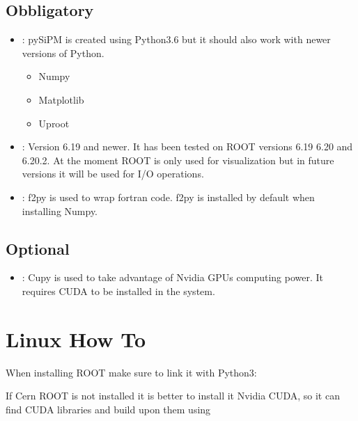 \documentclass[letterpaper,10pt,english]{sphinxmanual}
\begin{document}
\subsection{Obbligatory}
\label{\detokenize{installation:obbligatory}}\begin{itemize}
\item {} 
: pySiPM is created using Python3.6 but it should also work with newer versions of Python.
\begin{itemize}
\item {} 
Numpy

\item {} 
Matplotlib

\item {} 
Uproot

\end{itemize}

\item {} 
: Version 6.19 and newer. It has been tested on ROOT versions 6.19 \sphinxhyphen{} 6.20 and 6.20.2. At the moment ROOT is only used for visualization but in future versions it will be used for I/O operations. 

\item {} 
: f2py is used to wrap fortran code. f2py is installed by default when installing Numpy.

\end{itemize}


\subsection{Optional}
\label{\detokenize{installation:optional}}\begin{itemize}
\item {} 
: Cupy is used to take advantage of Nvidia GPUs computing power. It requires CUDA to be installed in the system. 

\end{itemize}


\section{Linux How To}
\label{\detokenize{installation:linux-how-to}}
\begin{DUlineblock}{0em}
\item[] When installing ROOT make sure to link it with Python3: 
\item[] If Cern ROOT is not installed it is better to install it  Nvidia CUDA, so it can find CUDA libraries and build upon them using 
\end{DUlineblock}
\end{document}
